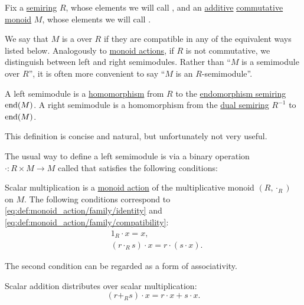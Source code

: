 \begin{definition}\label{def:semimodule}
  Fix a \hyperref[def:semiring]{semiring} \( R \), whose elements we will call , and an \hyperref[rem:additive_magma]{additive} \hyperref[def:magma/commutative]{commutative} \hyperref[def:monoid]{monoid} \( M \), whose elements we will call .

  We say that \( M \) is a  over \( R \) if they are compatible in any of the equivalent ways listed below. Analogously to \hyperref[def:monoid_action]{monoid actions}, if \( R \) is not commutative, we distinguish between left and right semimodules. Rather than \enquote{\( M \) is a semimodule over \( R \)}, it is often more convenient to say \enquote{\( M \) is an \( R \)-semimodule}.

  \begin{thmenum}[series=def:semimodule]
     A left semimodule is a \hyperref[def:semiring/homomorphism]{homomorphism} from \( R \) to the \hyperref[def:endomorphism_semiring]{endomorphism semiring} \( \operatorname{end}(M) \). A right semimodule is a homomorphism from the \hyperref[def:semiring/opposite]{dual semiring} \( R^{-1} \) to \( \operatorname{end}(M) \).

    This definition is concise and natural, but unfortunately not very useful.

     The usual way to define a left semimodule is via a binary operation \( \cdot: R \times M \to M \) called  that satisfies the following conditions:
    \begin{thmenum}
       Scalar multiplication is a \hyperref[def:monoid_action]{monoid action} of the multiplicative monoid \( (R, \cdot_R) \) on \( M \). The following conditions correspond to \eqref{eq:def:monoid_action/family/identity} and \eqref{eq:def:monoid_action/family/compatibility}:
      \begin{align}
        &1_R \cdot x = x, \label{eq:def:semimodule/operation/scalar_multiplication_action/identity} \\
        &(r \cdot_R s) \cdot x = r \cdot (s \cdot x). \label{eq:def:semimodule/operation/scalar_multiplication_action/compatibility}
      \end{align}

      The second condition can be regarded as a form of associativity.

       Scalar addition distributes over scalar multiplication:
      \begin{equation}\label{eq:def:semimodule/operation/scalar_addition_distributivity}
        (r +_R s) \cdot x = r \cdot x + s \cdot x.
      \end{equation}


\end{thmenum}
\end{thmenum}
\end{definition}
